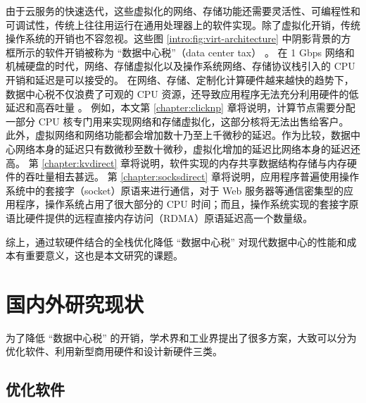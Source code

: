 由于云服务的快速迭代，这些虚拟化的网络、存储功能还需要灵活性、可编程性和可调试性，传统上往往用运行在通用处理器上的软件实现。除了虚拟化开销，传统操作系统的开销也不容忽视。这些图 \ref{intro:fig:virt-architecture} 中阴影背景的方框所示的软件开销被称为 ``数据中心税''（data center tax） \cite{barroso2009datacenter,barroso2013datacenter,barroso2018datacenter}。
在 1 Gbps 网络和机械硬盘的时代，网络、存储虚拟化以及操作系统网络、存储协议栈引入的 CPU 开销和延迟是可以接受的。
在网络、存储、定制化计算硬件越来越快的趋势下，数据中心税不仅浪费了可观的 CPU 资源，还导致应用程序无法充分利用硬件的低延迟和高吞吐量 \cite{barroso2017attack}。
例如，本文第 \ref{chapter:clicknp} 章将说明，计算节点需要分配一部分 CPU 核专门用来实现网络和存储虚拟化，这部分核将无法出售给客户。
此外，虚拟网络和网络功能都会增加数十乃至上千微秒的延迟。作为比较，数据中心网络本身的延迟只有数微秒至数十微秒，虚拟化增加的延迟比网络本身的延迟还高。
第 \ref{chapter:kvdirect} 章将说明，软件实现的内存共享数据结构存储与内存硬件的吞吐量相去甚远。
第 \ref{chapter:socksdirect} 章将说明，应用程序普遍使用操作系统中的套接字（socket）原语来进行通信，对于 Web 服务器等通信密集型的应用程序，操作系统占用了很大部分的 CPU 时间；而且，操作系统实现的套接字原语比硬件提供的远程直接内存访问（RDMA）原语延迟高一个数量级。

综上，通过软硬件结合的全栈优化降低 ``数据中心税'' 对现代数据中心的性能和成本有重要意义，这也是本文研究的课题。





\section{国内外研究现状}

为了降低 ``数据中心税'' 的开销，学术界和工业界提出了很多方案，大致可以分为优化软件、利用新型商用硬件和设计新硬件三类。

\subsection{优化软件}
\label{background:sec:software}

